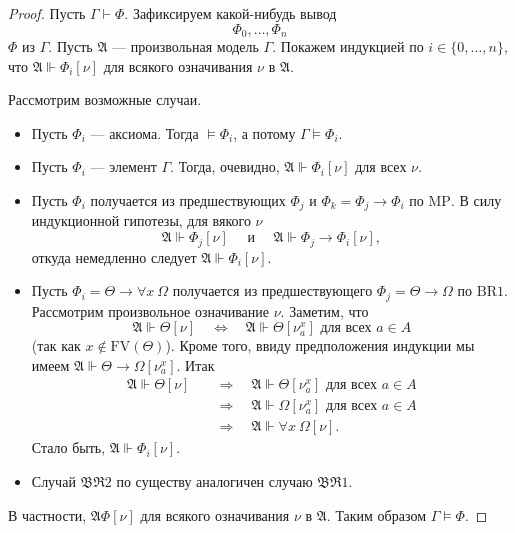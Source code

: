 \documentclass[12pt,a4paper]{article}
\newcommand{\FV}{\ensuremath{\mathrm{FV}}\xspace}
\begin{document}
    \begin{proof}
        Пусть $\Gamma \vdash \Phi$. Зафиксируем какой-нибудь вывод
        \[\Phi_0, \dots, \Phi_n\]
        $\Phi$ из $\Gamma$. Пусть $\mathfrak{A}$ --- произвольная модель $\Gamma$. Покажем индукцией по $i \in \{0, \dots, n\}$, что $\mathfrak{A} \Vdash \Phi_i [\nu]$ для всякого означивания $\nu$ в $\mathfrak{A}$.

        Рассмотрим возможные случаи.
        \begin{itemize}
            \item Пусть $\Phi_i$ --- аксиома. Тогда $\vDash \Phi_i$, а потому $\Gamma \vDash \Phi_i$.
            \item Пусть $\Phi_i$ --- элемент $\Gamma$. Тогда, очевидно, $\mathfrak{A} \Vdash \Phi_i [\nu]$ для всех $\nu$.
            \item Пусть $\Phi_i$ получается из предшествующих $\Phi_j$ и $\Phi_k = \Phi_j \rightarrow \Phi_i$ по $\mathrm{MP}$. В силу индукционной гипотезы, для вякого $\nu$
                \[
                    \mathfrak{A} \Vdash \Phi_j [\nu]
                    \quad \text{ и } \quad
                    \mathfrak{A} \Vdash \Phi_j \rightarrow \Phi_i [\nu],
                \]
                откуда немедленно следует $\mathfrak{A} \Vdash \Phi_i [\nu]$.
            \item Пусть $\Phi_i = \Theta \rightarrow \forall x\ \Omega$ получается из предшествующего $\Phi_j = \Theta \rightarrow \Omega$ по $\mathrm{BR1}$. Рассмотрим произвольное означивание $\nu$. Заметим, что
                \[
                    \mathfrak{A} \Vdash \Theta[\nu]
                    \quad \Longleftrightarrow \quad
                    \mathfrak{A} \Vdash \Theta[\nu_a^x] \text{ для всех } a \in A
                \]
                (так как $x \notin \FV(\Theta)$). Кроме того, ввиду предположения индукции мы имеем $\mathfrak{A} \Vdash \Theta \rightarrow \Omega [\nu_a^x]$. Итак
                \begin{align*}
                    \mathfrak{A} \Vdash \Theta [\nu]\quad
                    &\Longrightarrow \quad \mathfrak{A} \Vdash \Theta [\nu_a^x] \text{ для всех } a \in A\\
                    &\Longrightarrow \quad \mathfrak{A} \Vdash \Omega [\nu_a^x] \text{ для всех } a \in A\\
                    &\Longrightarrow \quad \mathfrak{A} \Vdash \forall x\ \Omega [\nu].
                \end{align*}
                Стало быть, $\mathfrak{A} \Vdash \Phi_i [\nu]$.
            \item Случай $\mathfrak{BR2}$ по существу аналогичен случаю $\mathfrak{BR1}$.
        \end{itemize}

        В частности, $\mathfrak{A} \Phi [\nu]$ для всякого означивания $\nu$ в $\mathfrak{A}$. Таким образом $\Gamma \vDash \Phi$.
    \end{proof}
\end{document}
